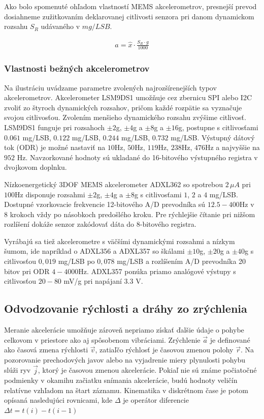 Ako bolo spomenuté ohľadom vlastností MEMS akcelerometrov, presnejší prevod dosiahneme zužitkovaním deklarovanej citlivosti
senzora pri danom dynamickom rozsahu $S_R$ udávaného v $mg/LSB$.
\begin{ceqn}\begin{align}
   a = \hat{x} \cdot \frac{S_R \cdot g}{1000}
\end{align}\end{ceqn}

\subsubsection{Vlastnosti bežných akcelerometrov}
Na ilustráciu uvádzame parametre zvolených najrozšírenejších typov akcelerometrov. Akcelerometer LSM9DS1 \cite{lsm9ds1} umožňuje cez
zbernicu SPI alebo I2C zvoliť zo štyroch dynamických rozsahov, pričom každé rozpätie sa vyznačuje svojou citlivosťou. Zvolením menšieho
dynamického rozsahu zvýšime citlivosť. LSM9DS1 funguje pri rozsahoch $\pm2$g, $\pm4$g a $\pm8$g a $\pm16$g, postupne s citlivosťami
$0.061$ mg/LSB, $0.122$ mg/LSB, $0.244$ mg/LSB, $0.732$ mg/LSB. Výstupný dátový tok (ODR) je možné nastaviť na $10$Hz, $50$Hz,
$119$Hz, $238$Hz, $476$Hz a najvyššie na $952$ Hz. Navzorkované hodnoty sú ukladané do 16-bitového výstupného registra v
dvojkovom doplnku.

Nízkoenergetický 3DOF MEMS akcelerometer ADXL362 \cite{adxl362} so spotrebou $2\,\mu A$ pri $100$Hz disponuje
rozsahmi $\pm2$g, $\pm4$g a $\pm8$g s citlivosťami $1$, $2$ a $4$ mg/LSB. Dostupné vzorkovacie frekvencie 12-bitového A/D prevodníka sú
$12.5 - 400$Hz v 8 krokoch vždy po násobkoch predošlého kroku. Pre rýchlejšie čítanie pri nižšom rozlíšení dokáže senzor zakódovať dáta
do 8-bitového registra.

Vyrábajú sa tiež akcelerometre s väčšími dynamickými rozsahmi a nízkym šumom, ide napríklad o ADXL356 a ADXL357 \cite{adxl357} so
škálami $\pm 10$g, $\pm 20$g a $\pm 40$g s citlivosťou $0,019$ mg/LSB po $0,078$ mg/LSB a rozlíšením A/D prevodníka 20 bitov pri
ODR $4 - 4000$Hz. ADXL357 ponúka priamo analógové výstupy s citlivosťou $20 - 80$ mV/g pri napájaní $3.3$ V.

\subsection{Odvodzovanie rýchlosti a dráhy zo zrýchlenia}
Meranie akcelerácie umožňuje zároveň nepriamo získať ďalšie údaje o pohybe celkovom v priestore ako aj spôsobenom vibráciami.
Zrýchlenie $\vec{a}$ je definované ako časová zmena rýchlosti $\vec{v}$, zatiaľčo rýchlosť je časovou zmenou polohy $\vec{r}$. Na
pozorovanie prechodových javov alebo na vyjadrenie miery plynulosti pohybu slúži ryv $\vec{j}$, ktorý je časovou zmenou akcelerácie.
Pokiaľ nie sú známe počiatočné podmienky v okamihu začiatku snímania akcelerácie, budú hodnoty veličín relatívne vzhľadom na
štart záznamu. Kinematika v diskrétnom čase je potom opísaná nasledujúci rovnicami, kde $\Delta$ je operátor diferencie
$\Delta t = t(i) - t(i-1)$

